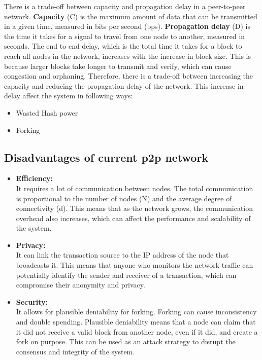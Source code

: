 There is a trade-off between capacity and propagation delay in a peer-to-peer network. \textbf{Capacity} (C) is the maximum amount of data that can be transmitted in a given time, measured in bits per second (bps). \textbf{Propagation delay} (D) is the time it takes for a signal to travel from one node to another, measured in seconds. The end to end delay, which is the total time it takes for a block to reach all nodes in the network, increases with the increase in block size. This is because larger blocks take longer to transmit and verify, which can cause congestion and orphaning. Therefore, there is a trade-off between increasing the capacity and reducing the propagation delay of the network. This increase in delay affect the system in following ways:
\begin{itemize}
	\item Wasted Hash power
	\item Forking
\end{itemize}
\subsection{Disadvantages of current p2p network}
\begin{itemize}
	\item \textbf{Efficiency:} \\ It requires a lot of communication between nodes. The total communication is proportional to the number of nodes (N) and the average degree of connectivity (d). This means that as the network grows, the communication overhead also increases, which can affect the performance and scalability of the system.
	\item \textbf{Privacy:} \\ It can link the transaction source to the IP address of the node that broadcasts it. This means that anyone who monitors the network traffic can potentially identify the sender and receiver of a transaction, which can compromise their anonymity and privacy.
	\item \textbf{Security:} \\ It allows for plausible deniability for forking. Forking can cause inconsistency and double spending. Plausible deniability means that a node can claim that it did not receive a valid block from another node, even if it did, and create a fork on purpose. This can be used as an attack strategy to disrupt the consensus and integrity of the system.
\end{itemize}

